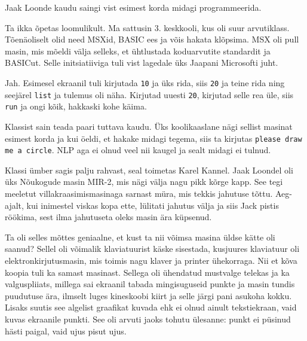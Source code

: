 Jaak Loonde kaudu saingi vist esimest korda midagi programmeerida. 


Ta ikka õpetas loomulikult. Ma sattusin 3. 
keskkooli, kus oli suur arvutiklass. Tõenäoliselt olid need MSXid, BASIC ees ja võis hakata klõpsima. 
MSX oli pull masin, mis mõeldi välja selleks, et 
ühtlustada koduarvutite standardit ja BASICut. Selle 
initsiatiiviga tuli vist lagedale üks Jaapani Microsofti juht.


Jah. Esimesel ekraanil tuli kirjutada \verb|10| ja üks rida, siis \verb|20| ja teine 
rida ning seejärel \verb|list| ja tulemus oli näha. Kirjutad uuesti 
\verb|20|, kirjutad selle rea üle, siis \verb|run| ja ongi kõik, 
hakkaski kohe käima. 

Klassist sain teada paari tuttava kaudu. Üks koolikaaslane nägi sellist
masinat esimest korda ja kui öeldi, et hakake midagi tegema, siis ta 
kirjutas \verb|please draw me a circle|. 
NLP aga ei olnud veel nii kaugel 
ja sealt midagi ei tulnud.

Klassi ümber sagis palju rahvast, seal toimetas Karel Kannel. 
Jaak Loondel oli üks Nõukogude masin 
MIR-2, mis nägi välja nagu 
pikk kõrge kapp. See tegi meeletut villakraasimismasinaga sarnast 
müra, mis tekkis jahutuse tõttu. Aeg-ajalt, kui inimestel 
viskas kopa ette, lülitati jahutus välja ja siis 
Jack pistis
röökima, sest ilma jahutuseta oleks masin ära küpsenud. 

Ta oli selles mõttes geniaalne, et kust ta nii võimsa masina üldse kätte oli saanud? Sellel oli võimalik klaviatuurist käske 
sisestada, kusjuures klaviatuur oli elektronkirjutusmasin, mis toimis
nagu klaver ja printer ühekorraga. Nii et kõva koopia tuli ka samast 
masinast. Sellega oli ühendatud mustvalge telekas ja ka 
valguspliiats, millega sai ekraanil tabada mingisuguseid punkte ja 
masin tundis puudutuse ära, ilmselt luges kineskoobi kiirt ja selle järgi 
pani asukoha kokku. Lisaks suutis see algelist graafikat 
kuvada ehk ei olnud ainult tekstiekraan, vaid kuvas ekraanile 
punkti. See oli arvuti jaoks tohutu ülesanne: punkt ei 
püsinud hästi paigal, vaid ujus pisut ujus. 

